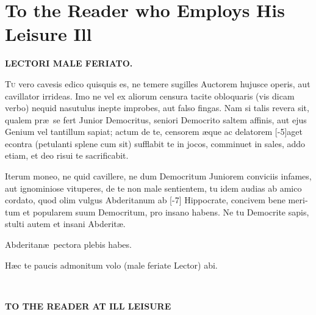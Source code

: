 \chapter{To the Reader who Employs His Leisure Ill}

\noindent\textbf{LECTORI MALE FERIATO.}

\begin{latin}
\lettrine{T}{u} vero cavesis edico quisquis es, ne temere sugilles Auctorem hujusce
operis, aut cavillator irrideas. Imo ne vel ex aliorum censura tacite
obloquaris (vis dicam verbo) nequid nasutulus inepte improbes, aut
falso fingas. Nam si talis revera sit, qualem pr\ae{}\ se fert Junior
Democritus, seniori Democrito saltem affinis, aut ejus Genium vel
tantillum sapiat; actum de te, censorem \ae{}que ac delatorem [-5\baselineskip]aget
econtra (petulanti splene cum sit) sufflabit te in jocos, comminuet in
sales, addo etiam, et deo risui te sacrificabit.

Iterum moneo, ne quid cavillere, ne dum Democritum Juniorem conviciis
infames, aut ignominiose vituperes, de te non male sentientem, tu idem
audias ab amico cordato, quod olim vulgus Abderitanum ab [-7\baselineskip]
Hippocrate, concivem bene meritum et popularem suum Democritum, pro
insano habens. Ne tu Democrite sapis, stulti autem et insani Abderit\ae{}.

Abderitan\ae{}\ pectora plebis habes.

H\ae{}c te paucis admonitum volo (male feriate Lector) abi.
\end{latin}

\begin{center}
{\Huge{}\color{maroon}}\par
\end{center}

\noindent\textbf{TO THE READER AT ILL LEISURE}

